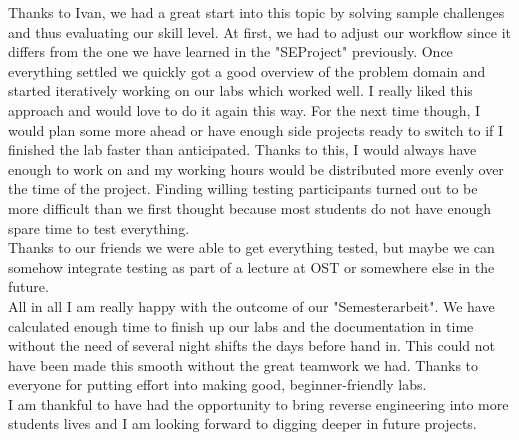 Thanks to Ivan, we had a great start into this topic by solving sample challenges and thus evaluating our skill level.
At first, we had to adjust our workflow since it differs from the one we have learned in the "SEProject" previously.
Once everything settled we quickly got a good overview of the problem domain and started iteratively working on our labs which worked well. 
I really liked this approach and would love to do it again this way. 
For the next time though, I would plan some more ahead or have enough side projects ready to switch to if I finished the lab faster than anticipated.
Thanks to this, I would always have enough to work on and my working hours would be distributed more evenly over the time of the project.
Finding willing testing participants turned out to be more difficult than we first thought because most students do not have enough spare time to test everything. \\
Thanks to our friends we were able to get everything tested, but maybe we can somehow integrate testing as part of a lecture at OST or somewhere else in the future.  \\
All in all I am really happy with the outcome of our "Semesterarbeit". 
We have calculated enough time to finish up our labs and the documentation in time without the need of several night shifts the days before hand in.
This could not have been made this smooth without the great teamwork we had. Thanks to everyone for putting effort into making good, beginner-friendly labs. \\
I am thankful to have had the opportunity to bring reverse engineering into more students lives and I am looking forward to digging deeper in future projects.
